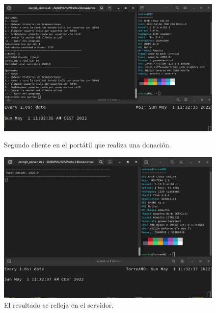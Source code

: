 \documentclass{article}
\begin{document}
\begin{figure}[H]
    \centering
    \begin{minipage}[H]{0.45\textwidth}
        \centering
        \includegraphics[width=\textwidth]{imagenes/multiples ordenadores/Cliente/Screenshot from 2022-05-01 11-32-38.png}
        \caption{Segundo cliente en el portátil que realiza una donación.}
    \end{minipage}
    \hfill
    \begin{minipage}[H]{0.45\textwidth}
        \centering
        \includegraphics[width=\textwidth]{imagenes/multiples ordenadores/Servidor/Screenshot from 2022-05-01 11-32-38.png}
        \caption{El resultado se refleja en el servidor.}
    \end{minipage}
\end{figure}
\end{document}
